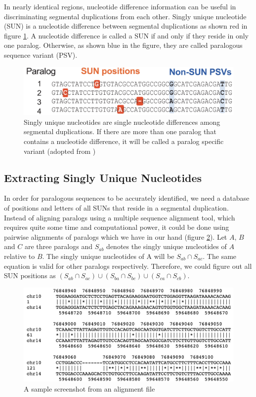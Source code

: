 In nearly identical regions, nucleotide difference information can be useful in discriminating segmental duplications from each other. Singly unique nucleotide (SUN) is a nucleotide difference between segmental duplications as shown red in figure \ref{singlyUniqueNucleotide}. A nucleotide difference is called a SUN if and only if they reside in only one paralog. Otherwise, as shown blue in the figure, they are called  paralogous sequence variant (PSV). 
\begin{figure}[ht]
    \centering
    \includegraphics[scale=0.4]{images/singlyUniqueNucleotide.png}
    \caption{Singly unique nucleotides are single nucleotide differences among segmental duplications. If there are more than one paralog that contains a nucleotide difference, it will be called a paralog specific variant (adopted from \cite{sudmant2010diversity})}
    \label{singlyUniqueNucleotide}
    \end{figure}

\subsection{Extracting Singly Unique Nucleotides}
In order for paralogous sequences to be accurately identified, we need a database of positions and letters of all SUNs that reside in a segmental duplication. Instead of aligning paralogs using a multiple sequence alignment tool, which requires quite some time and computational power, it could be done using pairwise alignments of paralogs which we have in our hand (figure \ref{alignmentFile}). Let $A$, $B$ and $C$ are three paralogs and  $S_{ab}$ denotes the singly unique nucleotides of $A$ relative to $B$. The singly unique nucleotides of A will be $S_{ab} \cap S_{ac}$. The same equation is valid for other paralogs respectively. Therefore, we could figure out all SUN positions as $(S_{ab} \cap S_{ac}) \cup (S_{ba} \cap S_{bc}) \cup (S_{ca} \cap S_{cb})$.

\begin{figure}[ht]
    \centering
    \includegraphics[scale=0.4]{images/alignmentFile.png}
    \caption{A sample screenshot from an alignment file}
    \label{alignmentFile}
\end{figure}

